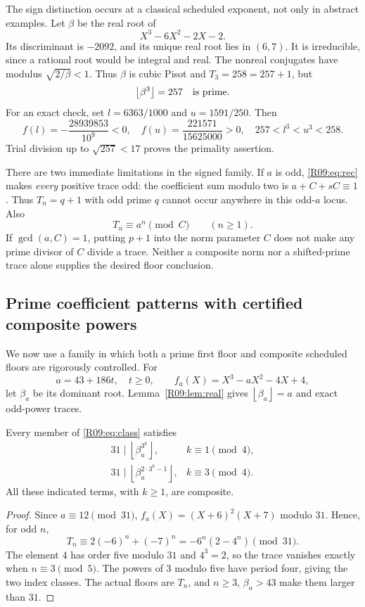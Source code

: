 \documentclass[11pt,a4paper]{article}
\theoremstyle{definition}\newtheorem{definition}[theorem]{Definition}
\theoremstyle{remark}\newtheorem{remark}[theorem]{Remark}
\newcommand{\floor}[1]{\left\lfloor#1\right\rfloor}
\begin{document}
The sign distinction occurs at a classical scheduled exponent, not
only in abstract examples. Let $\beta$ be the real root of
\[
 X^3-6X^2-2X-2.
\]
Its discriminant is $-2092$, and its unique real root lies in $(6,7)$.
It is irreducible, since a rational root would be integral and real.
The nonreal conjugates have modulus $\sqrt{2/\beta}<1$. Thus $\beta$ is
cubic Pisot and $T_3=258=257+1$, but
\begin{equation}\label{R09:eq:257}
 \floor{\beta^3}=257\quad\hbox{is prime}.
\end{equation}
For an exact check, set $l=6363/1000$ and $u=1591/250$. Then
\[
 f(l)=-\frac{28939853}{10^9}<0,
 \quad f(u)=\frac{221571}{15625000}>0,
 \quad 257<l^3<u^3<258.
\]
Trial division up to $\sqrt{257}<17$ proves the primality assertion.

There are two immediate limitations in the signed family. If $a$ is
odd, \eqref{R09:eq:rec} makes \emph{every} positive trace odd: the coefficient
sum modulo two is $a+C+sC\equiv1$. Thus $T_n=q+1$ with odd prime $q$
cannot occur anywhere in this odd-$a$ locus. Also
\begin{equation}\label{R09:eq:norm}
 T_n\equiv a^n\pmod C\qquad(n\ge1).
\end{equation}
If $\gcd(a,C)=1$, putting $p+1$ into the norm parameter $C$ does not
make any prime divisor of $C$ divide a trace. Neither a composite norm
nor a shifted-prime trace alone supplies the desired floor conclusion.

\subsection{Prime coefficient patterns with certified composite powers}

We now use a family in which both a prime first floor and composite
scheduled floors are rigorously controlled. For
\begin{equation}\label{R09:eq:class}
 a=43+186t,\quad t\ge0,\qquad f_a(X)=X^3-aX^2-4X+4,
\end{equation}
let $\beta_a$ be its dominant root. Lemma~\ref{R09:lem:real} gives
$\floor{\beta_a}=a$ and exact odd-power traces.

\begin{proposition}\label{R09:prop:31}
Every member of \eqref{R09:eq:class} satisfies
\[
\begin{array}{ll}
31\mid\floor{\beta_a^{3^k}},& k\equiv1\pmod4,\\
31\mid\floor{\beta_a^{2\cdot3^k-1}},& k\equiv3\pmod4.
\end{array}
\]
All these indicated terms, with $k\ge1$, are composite.
\end{proposition}
\begin{proof}
Since $a\equiv12\pmod{31}$,
$f_a(X)=(X+6)^2(X+7)$ modulo $31$. Hence, for odd $n$,
\[
 T_n\equiv 2(-6)^n+(-7)^n
       =-6^n(2-4^n)\pmod{31}.
\]
The element $4$ has order five modulo $31$ and $4^3=2$, so the trace
vanishes exactly when $n\equiv3\pmod5$. The powers of $3$ modulo five
have period four, giving the two index classes. The actual floors
are $T_n$, and $n\ge3$, $\beta_a>43$ make them larger than $31$.
\end{proof}
\end{document}
